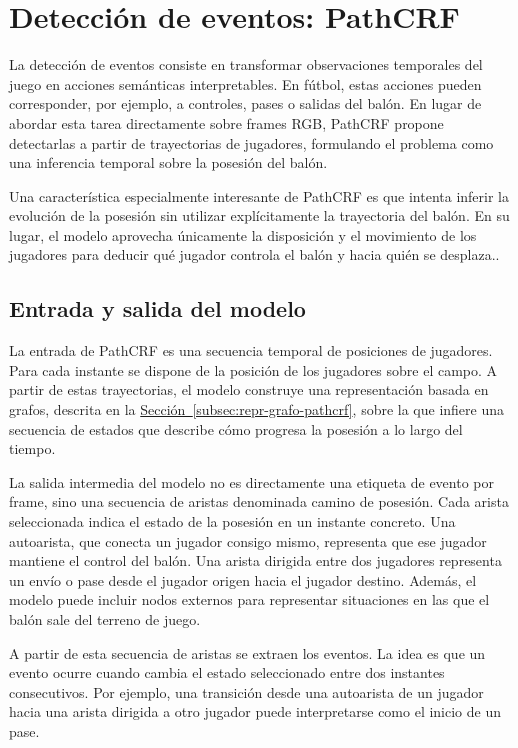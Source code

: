 \section{Detección de eventos: PathCRF}
\label{sec:pathcrf-tecnologias}
La detección de eventos consiste en transformar observaciones temporales del juego en acciones semánticas interpretables. En fútbol, estas acciones pueden corresponder, por ejemplo, a controles, pases o salidas del balón. En lugar de abordar esta tarea directamente sobre frames RGB, PathCRF \citep{KimPathCRF2026} propone detectarlas a partir de trayectorias de jugadores, formulando el problema como una inferencia temporal sobre la posesión del balón.

Una característica especialmente interesante de PathCRF es que intenta inferir la evolución de la posesión sin utilizar explícitamente la trayectoria del balón. En su lugar, el modelo aprovecha únicamente la disposición y el movimiento de los jugadores para deducir qué jugador controla el balón y hacia quién se desplaza..

\subsection{Entrada y salida del modelo}
La entrada de PathCRF es una secuencia temporal de posiciones de jugadores. Para cada instante se dispone de la posición de los jugadores sobre el campo. A partir de estas trayectorias, el modelo construye una representación basada en grafos, descrita en la \hyperref[subsec:repr-grafo-pathcrf]{Sección~\ref*{subsec:repr-grafo-pathcrf}}, sobre la que infiere una secuencia de estados que describe cómo progresa la posesión a lo largo del tiempo.

La salida intermedia del modelo no es directamente una etiqueta de evento por frame, sino una secuencia de aristas denominada camino de posesión. Cada arista seleccionada indica el estado de la posesión en un instante concreto. Una autoarista, que conecta un jugador consigo mismo, representa que ese jugador mantiene el control del balón. Una arista dirigida entre dos jugadores representa un envío o pase desde el jugador origen hacia el jugador destino. Además, el modelo puede incluir nodos externos para representar situaciones en las que el balón sale del terreno de juego.

A partir de esta secuencia de aristas se extraen los eventos. La idea es que un evento ocurre cuando cambia el estado seleccionado entre dos instantes consecutivos. Por ejemplo, una transición desde una autoarista de un jugador hacia una arista dirigida a otro jugador puede interpretarse como el inicio de un pase.

